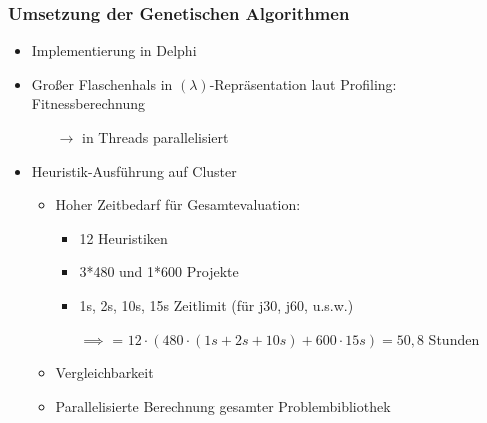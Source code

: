 \begin{frame}[noframenumbering]
\frametitle{Umsetzung der Genetischen Algorithmen}
\begin{itemize}
\item Implementierung in Delphi\\[4mm]
\item Großer Flaschenhals in $(\lambda)$-Repräsentation laut Profiling: Fitnessberechnung 
\begin{itemize}\item[$\rightarrow$] in Threads parallelisiert\\[4mm]\end{itemize}
\item Heuristik-Ausführung auf Cluster
\begin{itemize}
	\item Hoher Zeitbedarf für Gesamtevaluation:
		\begin{itemize}
		\item 12 Heuristiken
		\item 3*480 und 1*600 Projekte
		\item 1s, 2s, 10s, 15s Zeitlimit (für j30, j60, u.s.w.)
		\item[$\implies$] = $12 \cdot (480\cdot (1s + 2s + 10s) + 600\cdot15s ) = 50{,}8$ Stunden
		\end{itemize}
	\item Vergleichbarkeit
	\item Parallelisierte Berechnung gesamter Problembibliothek
\end{itemize}
\end{itemize}
\end{frame}


